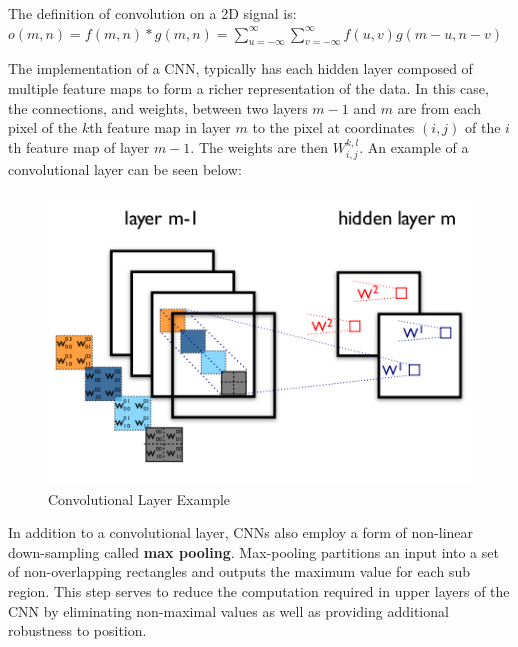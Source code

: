 \documentclass{article}
\begin{document}
  The definition of convolution on a 2D signal is: \\
  $o(m,n) = f(m,n) \ast g(m,n) = \sum_{u=-\infty}^{\infty} \sum_{v=-\infty}^{\infty} f(u,v)g(m - u,n - v)$
  
  The implementation of a CNN, typically has each hidden layer composed of multiple feature maps to form a richer
  representation of the data. In this case, the connections, and weights, between two layers $m-1$ and $m$ are from each
  pixel of the $k$th feature map in layer $m$ to the pixel at coordinates $(i,j)$ of the $i$th feature map of layer $m-1$.
  The weights are then $W_{i,j}^{k,l}$. An example of a convolutional layer can be seen below: \\
  \FloatBarrier
  \begin{figure}[h]
    \caption{Convolutional Layer Example}
    \centering
    \includegraphics[scale=0.5]{images/conv_layer_cnn_example}
  \end{figure}
  \FloatBarrier
  
  In addition to a convolutional layer, CNNs also employ a form of non-linear down-sampling called \textbf{max pooling}.
  Max-pooling partitions an input into a set of non-overlapping rectangles and outputs the maximum value for each sub region.
  This step serves to reduce the computation required in upper layers of the CNN by eliminating non-maximal values as well as
  providing additional robustness to position.
  
\end{document}
